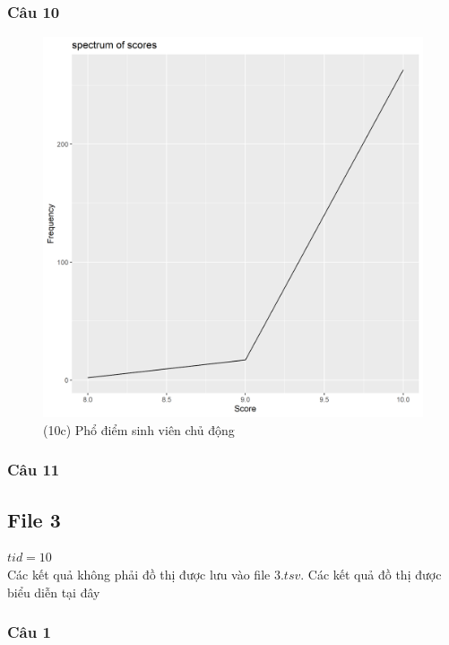 \documentclass[a4paper]{article}
\theoremstyle{definition}
\begin{document}
\subsubsection{Câu 10}
\newpage
\begin{figure}[!ht]
    \centering
    \includegraphics[scale=0.4]{Pics/q10c_file2.png}
    \caption{(10c) Phổ điểm sinh viên chủ động}
    \label{fig:my_label}
\end{figure}
\newpage
\subsubsection{Câu 11}

\newpage 
\subsection{File 3}
\textbf{$tid = 10$}\\
Các kết quả không phải đồ thị được lưu vào file $3.tsv$. Các kết quả đồ thị được biểu diễn tại đây
\subsubsection{Câu 1}
\end{document}
